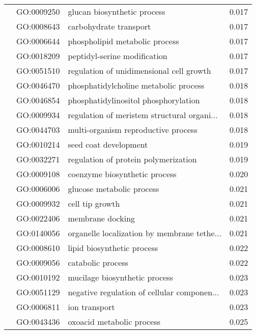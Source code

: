 \begin{longtable}{lllr}
   & GO:0009250 &                  glucan biosynthetic process &         0.017 \\
   & GO:0008643 &                       carbohydrate transport &         0.017 \\
   & GO:0006644 &               phospholipid metabolic process &         0.017 \\
   & GO:0018209 &                 peptidyl-serine modification &         0.017 \\
   & GO:0051510 &     regulation of unidimensional cell growth &         0.017 \\
   & GO:0046470 &        phosphatidylcholine metabolic process &         0.018 \\
   & GO:0046854 &         phosphatidylinositol phosphorylation &         0.018 \\
   & GO:0009934 &  regulation of meristem structural organi... &         0.018 \\
   & GO:0044703 &          multi-organism reproductive process &         0.018 \\
   & GO:0010214 &                        seed coat development &         0.019 \\
   & GO:0032271 &         regulation of protein polymerization &         0.019 \\
   & GO:0009108 &                coenzyme biosynthetic process &         0.020 \\
   & GO:0006006 &                    glucose metabolic process &         0.021 \\
   & GO:0009932 &                              cell tip growth &         0.021 \\
   & GO:0022406 &                             membrane docking &         0.021 \\
   & GO:0140056 &  organelle localization by membrane tethe... &         0.021 \\
   & GO:0008610 &                   lipid biosynthetic process &         0.022 \\
   & GO:0009056 &                            catabolic process &         0.022 \\
   & GO:0010192 &                mucilage biosynthetic process &         0.023 \\
   & GO:0051129 &  negative regulation of cellular componen... &         0.023 \\
   & GO:0006811 &                                ion transport &         0.023 \\
   & GO:0043436 &                    oxoacid metabolic process &         0.025 \\

\end{longtable}
